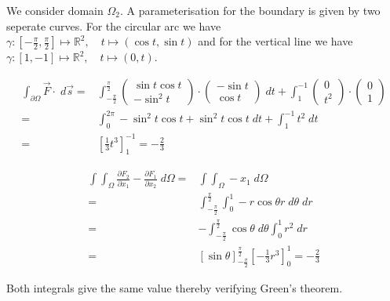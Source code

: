 \documentclass[11pt]{article}
\begin{document}
\begin{solution}
We consider domain $\Omega_2$. A parameterisation for the boundary is given by two seperate curves. For the circular arc we have $\gamma: [-\frac{\pi}{2},\frac{\pi}{2}] \mapsto \mathbb{R}^2, \quad t\mapsto  (\cos t, \sin t)$ and for the vertical line we have  $\gamma: [1,-1] \mapsto \mathbb{R}^2, \quad t\mapsto  (0, t)$. 

\begin{align*}
\int_{\partial \Omega} \vec{F} \cdot \;d\vec{s} =& \int_{-\frac{\pi}{2}}^ {\frac{\pi}{2}} \begin{pmatrix}\sin t \cos t\\ -\sin^2 t \end{pmatrix} \cdot \begin{pmatrix}-\sin t \\ \cos t \end{pmatrix} \; d t + \int_1^ {-1} \begin{pmatrix}0\\t^ 2\end{pmatrix}\cdot \begin{pmatrix}0\\1\end{pmatrix}\\
=& \int_0^{2\pi} -\sin^2 t\cos t + \sin^ 2 t \cos t \;dt + \int_{1}^ {-1} t^ 2 \;d t\\
=& \left[\frac{1}{3} t^ 3\right]_1^ {-1} = -\frac{2}{3}
\end{align*}

\begin{align*}
\int \int_{\Omega} \frac{\partial F_2}{\partial x_1} - \frac{\partial F_1}{\partial x_2} \;d \Omega =& \int \int_{\Omega} -x_1 \; d\Omega\\
=& \int_{-\frac{\pi}{2}}^ {\frac{\pi}{2}} \int_0^1 -r\cos \theta r \;d\theta\;dr\\
=& -\int_{-\frac{\pi}{2}}^ {\frac{\pi}{2}} \cos \theta \;d \theta \int_0^1 r^ 2 \;d r\\
=& \left[\sin \theta\right]_{-\frac{\pi}{2}}^ {\frac{\pi}{2}} \left[-\frac{1}{3}r^ 3\right]_0^{1} = -\frac{2}{3}
\end{align*}

Both integrals give the same value thereby verifying Green's theorem.\\

\end{solution}
\end{document}
